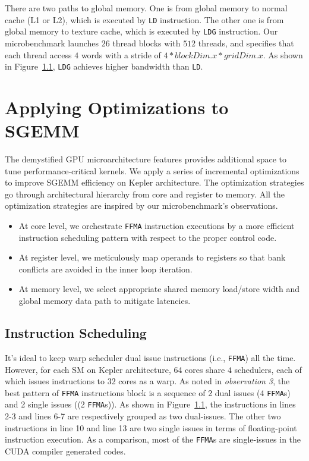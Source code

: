 \documentclass{sig-alternate-05-2015}
\begin{document}
There are two paths to global memory. One is from global memory to normal cache (L1 or L2), which is executed by {\tt LD} instruction. The other one is from global memory to texture cache, which is executed by {\tt LDG} instruction. Our microbenchmark launches $26$ thread blocks with $512$ threads, and specifies that each thread access $4$ words with a stride of $4*blockDim.x*gridDim.x$. As shown in  Figure~\ref{}, {\tt LDG} achieves higher bandwidth than {\tt LD}.


\section{Applying Optimizations to SGEMM }
\label{sec:optimization}
The demystified GPU microarchitecture features provides additional space to tune performance-critical kernels. We apply a series of incremental optimizations to improve SGEMM efficiency on Kepler architecture. The optimization strategies go through architectural hierarchy from core and register to memory. All the optimization strategies are inspired by our microbenchmark's observations.
\begin{itemize}
\item At core level, we orchestrate {\tt FFMA} instruction executions by a more efficient instruction scheduling pattern with respect to the proper control code.
\item At register level, we meticulously map operands to registers so that  bank conflicts are avoided in the inner loop iteration.
\item At memory level, we select appropriate shared memory load/store width and global memory data path to mitigate latencies.
\end{itemize}

\subsection{Instruction Scheduling}
It's ideal to keep warp scheduler dual issue instructions (i.e., {\tt FFMA}) all the time. However, for each SM on Kepler architecture, 64 cores share $4$ schedulers, each of which issues instructions to 32 cores as a warp. As noted in {\em observation 3}, the best pattern of {\tt FFMA} instructions block is a sequence of 2 dual issues (4 {\tt FFMA}s) and 2 single issues ((2 {\tt FFMA}s)). As shown in Figure~\ref{}, the instructions in lines 2-3 and lines 6-7 are respectively grouped as two dual-issues. The other two instructions in line 10 and line 13 are two single issues in terms of floating-point instruction execution. As a comparison, most of the {\tt FFMA}s are single-issues in the CUDA compiler generated codes.
\end{document}
